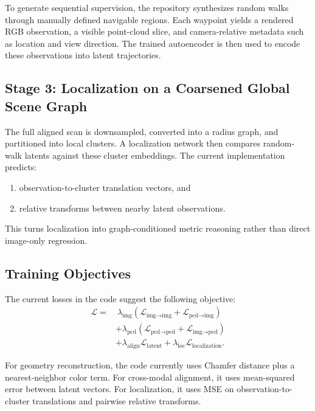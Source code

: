 To generate sequential supervision, the repository synthesizes random walks through manually defined navigable regions. Each waypoint yields a rendered RGB observation, a visible point-cloud slice, and camera-relative metadata such as location and view direction. The trained autoencoder is then used to encode these observations into latent trajectories.

\subsection{Stage 3: Localization on a Coarsened Global Scene Graph}

The full aligned scan is downsampled, converted into a radius graph, and partitioned into local clusters. A localization network then compares random-walk latents against these cluster embeddings. The current implementation predicts:
\begin{enumerate}[leftmargin=*]
  \item observation-to-cluster translation vectors, and
  \item relative transforms between nearby latent observations.
\end{enumerate}

This turns localization into graph-conditioned metric reasoning rather than direct image-only regression.

\subsection{Training Objectives}

The current losses in the code suggest the following objective:
\begin{align}
\mathcal{L} = &\ \lambda_{\text{img}} \left(\mathcal{L}_{\text{img}\rightarrow\text{img}} + \mathcal{L}_{\text{pcd}\rightarrow\text{img}}\right) \\
&+ \lambda_{\text{pcd}} \left(\mathcal{L}_{\text{pcd}\rightarrow\text{pcd}} + \mathcal{L}_{\text{img}\rightarrow\text{pcd}}\right) \\
&+ \lambda_{\text{align}} \mathcal{L}_{\text{latent}} + \lambda_{\text{loc}} \mathcal{L}_{\text{localization}}.
\end{align}

For geometry reconstruction, the code currently uses Chamfer distance plus a nearest-neighbor color term. For cross-modal alignment, it uses mean-squared error between latent vectors. For localization, it uses MSE on observation-to-cluster translations and pairwise relative transforms.

